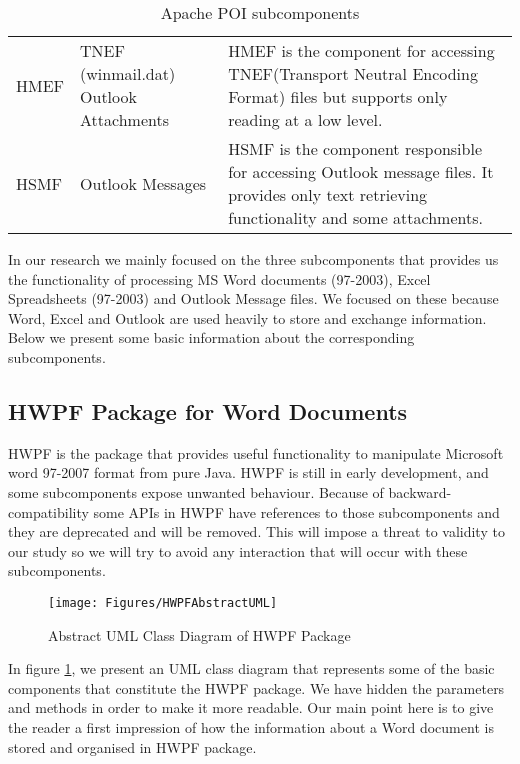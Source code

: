 \begin{table}
\begin{tabular}{l|p{3cm}|p{6cm}}
    HMEF                 & TNEF (winmail.dat) Outlook Attachments & HMEF is the component for accessing TNEF(Transport Neutral Encoding Format) files but supports only reading at a low level.                                                                                                                   \\
    HSMF                 & Outlook Messages                       & HSMF is the component responsible for accessing Outlook message files. It provides only text retrieving functionality and some attachments.                                                                                                   \\
    \hline
    \end{tabular}
    \caption{Apache POI subcomponents}\label{tab:ApacheTable}
    
\end{table}

In our research we mainly focused on the three subcomponents that provides us the functionality of processing MS Word documents (97-2003), Excel Spreadsheets (97-2003) and Outlook Message files. We focused on these because Word, Excel and Outlook are used heavily to store and exchange information\cite{signifWord}. Below we present some basic information about the corresponding subcomponents.

\subsection{HWPF Package for Word Documents}

HWPF is the package that provides useful functionality to manipulate Microsoft word 97-2007 format from pure Java. HWPF is still in early development, and some subcomponents expose unwanted behaviour. Because of backward-compatibility some APIs in HWPF have references to those subcomponents and they are deprecated and will be removed\cite{POI}. This will impose a threat to validity to our study so we will try to avoid any interaction that will occur with these subcomponents.

\begin{figure}[center]
\texttt{[image: Figures/HWPFAbstractUML]}
\caption{Abstract UML Class Diagram of HWPF Package}
\label{fig:HWPFUML}
\end{figure}

In figure \ref{fig:HWPFUML}, we present an UML class diagram that represents some of the basic components that constitute the HWPF package. We have hidden the parameters and methods in order to make it more readable. Our main point here is to give the reader a first impression of how the information about a Word document is stored and organised in HWPF package.

